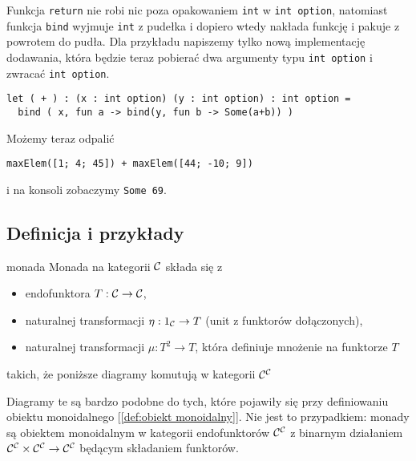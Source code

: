 Funkcja \lstinline{return} nie robi nic poza opakowaniem \lstinline{int} w \lstinline{int option}, natomiast funkcja \lstinline{bind} wyjmuje \lstinline{int} z pudełka i dopiero wtedy nakłada funkcję i pakuje z powrotem do pudła. Dla przykładu napiszemy tylko nową implementację dodawania, która będzie teraz pobierać dwa argumenty typu \lstinline{int option} i zwracać \lstinline{int option}.

\begin{lstlisting}
let ( + ) : (x : int option) (y : int option) : int option = 
  bind ( x, fun a -> bind(y, fun b -> Some(a+b)) )
\end{lstlisting}

Możemy teraz odpalić
\begin{lstlisting}
maxElem([1; 4; 45]) + maxElem([44; -10; 9])
\end{lstlisting}
i na konsoli zobaczymy \lstinline{Some 69}.

\subsection{Definicja i przykłady}

\begin{definition}{monada}{}
  Monada na kategorii $\mathcal{C}$ składa się z
  \begin{itemize}
    \item endofunktora $T:\mathcal{C}\to\mathcal{C}$,
    \item naturalnej transformacji $\eta:1_{\mathcal{C}}\to T$ (unit z funktorów dołączonych),
    \item naturalnej transformacji $\mu:T^2\to T$, która definiuje mnożenie na funktorze $T$
  \end{itemize}
  takich, że poniższe diagramy komutują w kategorii $\mathcal{C}^{\mathcal{C}}$
  \begin{center}
  \end{center}
\end{definition}

Diagramy te są bardzo podobne do tych, które pojawiły się przy definiowaniu obiektu monoidalnego [\ref{def:obiekt monoidalny}]. Nie jest to przypadkiem: monady są obiektem monoidalnym w kategorii endofunktorów $\mathcal{C}^{\mathcal{C}}$ z binarnym działaniem $\mathcal{C}^{\mathcal{C}}\times\mathcal{C}^{\mathcal{C}}\to \mathcal{C}^{\mathcal{C}}$ będącym składaniem funktorów.

